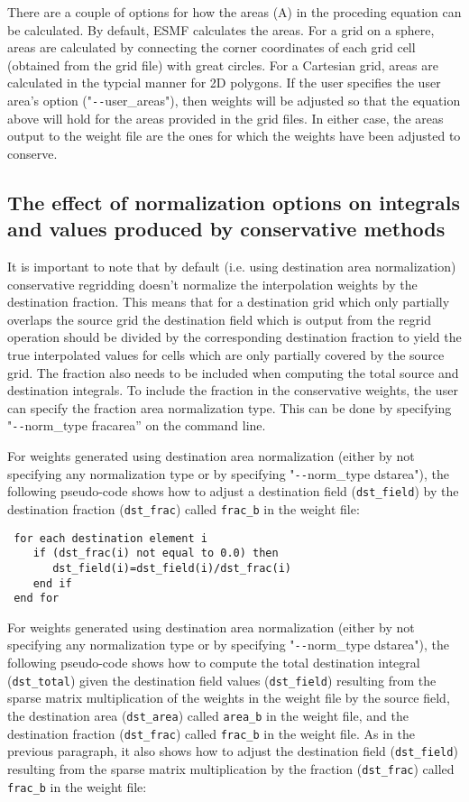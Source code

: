  There are a couple of options for how the areas (A) in the proceding equation can be calculated. By default, ESMF calculates the areas. For a grid on a sphere, 
areas are calculated by connecting the corner coordinates of each grid cell (obtained from the grid file) with great circles. For a Cartesian grid, areas are calculated
in the typcial manner for 2D polygons. If the user specifies the user area's option ("\verb+--+user\_areas"), then weights will be adjusted so that the equation above 
will hold for the areas provided in the grid files. In either case, the areas output to the weight file are the ones for which the weights have been adjusted to conserve.

\subsection{The effect of normalization options on integrals and values produced by conservative methods}\label{sec:rwg:conservative_norm_opts}
 It is important to note that by default (i.e. using destination area normalization) conservative regridding doesn't normalize the interpolation weights by the destination fraction. This means that for a destination grid which only partially overlaps the source grid the destination field which is output from the regrid operation should be divided by the corresponding destination fraction to yield the true interpolated values for cells which are only partially covered by the source grid.
The fraction also needs to be included when computing the total source and destination integrals. To include the fraction in the conservative weights, the user can specify the fraction area normalization type. This can be done by specifying "\verb+--+norm\_type fracarea'' on the command line. 

For weights generated using destination area normalization (either by not specifying any normalization type or by specifying "\verb+--+norm\_type dstarea"), 
the following pseudo-code shows how to adjust a destination field ({\tt dst\_field}) by the destination fraction ({\tt dst\_frac}) called {\tt frac\_b} in the weight file:

\begin{verbatim}
 for each destination element i
    if (dst_frac(i) not equal to 0.0) then
       dst_field(i)=dst_field(i)/dst_frac(i)
    end if
 end for
\end{verbatim}

For weights generated using destination area normalization (either by not specifying any normalization type or by specifying "\verb+--+norm\_type dstarea"), 
the following pseudo-code shows how to compute the total destination integral ({\tt dst\_total}) given the destination field values ({\tt dst\_field}) resulting
from the sparse matrix multiplication of the weights in the weight file by the source field, the destination area ({\tt dst\_area}) called {\tt area\_b} in the
weight file, and the destination fraction ({\tt dst\_frac}) called {\tt frac\_b} in the weight file. As in the previous paragraph, it also
shows how to adjust the destination field ({\tt dst\_field}) resulting from the sparse matrix multiplication by the fraction
({\tt dst\_frac}) called {\tt frac\_b} in the weight file:


